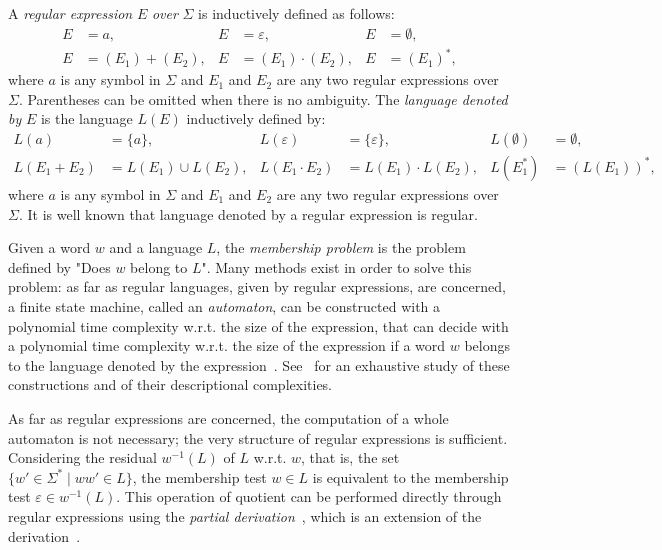 \documentclass[a4paper]{llncs}
\begin{document}
  A \emph{regular expression} $E$ \emph{over} $\Sigma$ is inductively defined as follows:
  \begin{align*}
    E&=a, & E&=\varepsilon,& E&=\emptyset,\\    
    E&=(E_1)+(E_2),& E&=(E_1)\cdot (E_2),& E&=(E_1)^*,
  \end{align*}
  where $a$ is any symbol in $\Sigma$ and $E_1$ and $E_2$ are any two regular expressions over $\Sigma$. Parentheses can be omitted when there is no ambiguity.  The \emph{language denoted by} $E$ is the language $L(E)$ inductively defined by:
  \begin{align*}
    L(a)&=\{a\},& L(\varepsilon)&=\{\varepsilon\},& L(\emptyset)&=\emptyset,\\
    L(E_1+E_2)&=L(E_1)\cup L(E_2),& L(E_1\cdot E_2)&=L(E_1)\cdot L(E_2),& L(E_1^*)&=(L(E_1))^*,
  \end{align*}
  where $a$ is any symbol in $\Sigma$ and $E_1$ and $E_2$ are any two regular expressions over $\Sigma$. It is well known that language denoted by a regular expression is regular.
  
  Given a word $w$ and a language $L$, the \emph{membership problem} is the problem defined by "Does $w$ belong to $L$". Many methods exist in order to solve this problem: 
as far as regular languages, given by regular expressions, are concerned, a finite state machine, called an \emph{automaton}, can be constructed with a polynomial time complexity w.r.t. the size of the expression, that can decide with a polynomial time complexity w.r.t. the size of the expression if a word $w$ belongs to the language denoted by the expression~\cite{Glu60,IY03,MY60,Tho68}. See~\cite{GH14} for an exhaustive study of these constructions and of their descriptional complexities.
  
  As far as regular expressions are concerned, the computation of a whole automaton is not necessary; the very structure of regular expressions is sufficient. 
Considering the residual $w^{-1}(L)$ of $L$ w.r.t. $w$, that is, the set
  $\{w'\in\Sigma^*\mid ww'\in L\}$, the membership test $w\in L$ is equivalent to the membership test $\varepsilon \in w^{-1}(L)$. This operation of quotient can be performed directly through regular expressions using the \emph{partial derivation}~\cite{Ant96}, which is an extension of the derivation~\cite{Brz64}.
  
\end{document}
